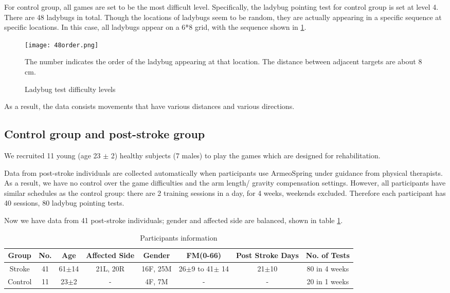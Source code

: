 For control group, all games are set to be the most difficult level. Specifically, the ladybug pointing test for control group is set at level 4. There are 48 ladybugs in total. Though the locations of ladybugs seem to be random, they are actually appearing in a specific sequence at specific locations. In this case, all ladybugs appear on a 6*8 grid, with the sequence shown in \ref{fig:48order}.

\begin{figure}
	\texttt{[image: 48order.png]}
	\centering
	\caption{Ladybug test difficulty levels}
	\medskip
	\small The number indicates the order of the ladybug appearing at that location. The distance between adjacent targets are about 8 cm.
	\label{fig:48order}
\end{figure}

As a result, the data consists movements that have various distances and various directions.

\subsection{Control group and post-stroke group}

We recruited 11 young (age 23 $\pm$ 2) healthy subjects (7 males) to play the games which are designed for rehabilitation.

Data from post-stroke individuals are collected automatically when participants use ArmeoSpring under guidance from physical therapists. As a result, we have no control over the game difficulties and the arm length/ gravity compensation settings. However, all participants have similar schedules as the control group: there are 2 training sessions in a day, for 4 weeks, weekends excluded. Therefore each participant has 40 sessions, 80 ladybug pointing tests.

Now we have data from 41 post-stroke individuals; gender and affected side are balanced, shown in table \ref{tab:demog}. 

\begin{table}[b]
	\begin{tabular}{c c c c c c c c}
	\hline
	Group & No. & Age & Affected Side & Gender & FM(0-66) & Post Stroke Days & No. of Tests\\
	\hline
	Stroke & 41 & 61$\pm$14 & 21L, 20R & 16F, 25M & 26$\pm$9 to 41$\pm$ 14 & 21$\pm$10 & 80 in 4 weeks \\ 
	Control & 11 & 23$\pm$2 & - & 4F, 7M & - & - & 20 in 1 weeks \\
	\hline
	\end{tabular}
	\caption{Participants information}
	\label{tab:demog}
\end{table}

